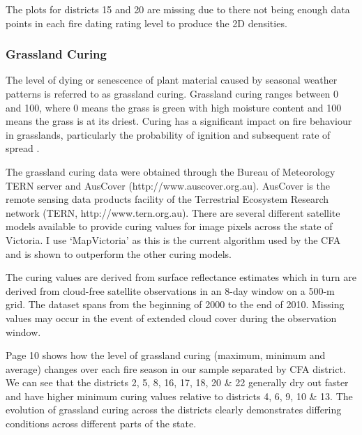 \documentclass[11pt,a4paper]{article}
\begin{document}
The plots for districts 15 and 20 are missing due to there not being enough data points in each fire dating rating level to produce the 2D densities.

\subsubsection{Grassland Curing}

The level of dying or senescence of plant material caused by seasonal weather patterns is referred to as grassland curing. Grassland curing ranges between 0 and 100, where 0 means the grass is green with high moisture content and 100 means the grass is at its driest. Curing has a significant impact on fire behaviour in grasslands, particularly the probability of ignition and subsequent rate of spread \citep{cheney08}.

The grassland curing data were obtained through the Bureau of Meteorology TERN server and AusCover (http://www.auscover.org.au). AusCover is the remote sensing data products facility of the Terrestrial Ecosystem Research network (TERN, http://www.tern.org.au). There are several different satellite models available to provide curing values for image pixels across the state of Victoria. I use `MapVictoria' \citep{martin15} as this is the current algorithm used by the CFA and is shown to outperform the other curing models.

The curing values are derived from surface reflectance estimates which in turn are derived from cloud-free satellite observations in an 8-day window on a 500-m grid. The dataset spans from the beginning of 2000 to the end of 2010. Missing values may occur in the event of extended cloud cover during the observation window.

Page 10 shows how the level of grassland curing (maximum, minimum and average) changes over each fire season in our sample separated by CFA district. We can see that the districts 2, 5, 8, 16, 17, 18, 20 \&  22 generally dry out faster and have higher minimum curing values relative to districts 4, 6, 9, 10 \& 13. The evolution of grassland curing across the districts clearly demonstrates differing conditions across different parts of the state.
\end{document}
